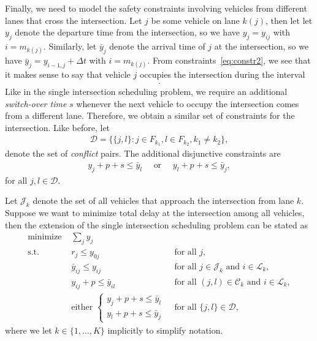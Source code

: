 \documentclass{article}
\theoremstyle{definition}
\theoremstyle{plain}
\begin{document}
Finally, we need to model the safety constraints involving vehicles from
different lanes that cross the intersection. Let $j$ be some vehicle on lane
$k(j)$, then let let $y_{j}$ denote the departure time from the intersection, so
we have $y_{j} = y_{ij}$ with $i=m_{k(j)}$. Similarly, let $\bar{y}_{j}$ denote
the arrival time of $j$ at the intersection, so we have
$\bar{y}_{j} = y_{i-1,j} + \Delta t$ with $i = m_{k(j)}$. From
constraints~\eqref{eq:constr2}, we see that it makes sense to say that vehicle
$j$ occupies the intersection during the interval
\begin{align}
  [\bar{y}_{j}, y_{j} + p] .
\end{align}
Like in the single intersection scheduling problem, we require an additional
\textit{switch-over time} $s$ whenever the next vehicle to occupy the
intersection comes from a different lane. Therefore, we obtain a similar set of
constraints for the intersection. Like before, let
\begin{align}
  \mathcal{D} = \{ \{j, l\} : j \in F_{k_{1}}, l \in F_{k_{2}} , k_{1} \neq k_{2} \} ,
\end{align}
denote the set of \textit{conflict} pairs. The additional disjunctive
constraints are
\begin{align}
  \label{eq:3}
  y_{j} + p + s \leq \bar{y}_{l} \quad \text{ or } \quad y_{l} + p + s \leq \bar{y}_{j} ,
\end{align}
for all $j, l \in \mathcal{D}$.

Let $\mathcal{J}_{k}$ denote the set of all vehicles that approach the
intersection from lane $k$. Suppose we want to minimize total delay at the
intersection among all vehicles, then the extension of the single intersection
scheduling problem can be stated as
\begin{subequations}
\begin{align}
  \label{eq:finite-buffer-problem}
  \text{minimize } & \sum_{j} y_{j} \\
  \text{s.t. } & r_{j} \leq y_{0j} & \text{ for all } j, \\
               & \bar{y}_{ij} \leq y_{ij} & \text{ for all } j \in \mathcal{J}_{k} \text{ and } i \in \mathcal{L}_{k}, \\
               & y_{ij} + p \leq \bar{y}_{il} & \text{ for all } (j,l) \in \mathcal{C}_{k} \text{ and } i \in \mathcal{L}_{k}, \\
               & \text{either } \begin{cases} y_{j} + p + s \leq \bar{y}_{l} \\ y_{l} + p + s \leq \bar{y}_{j} \end{cases} & \text{ for all } \{j,l\} \in \mathcal{D} ,
\end{align}
\end{subequations}
where we let $k \in \{1, \dots, K\}$ implicitly to simplify notation.
\end{document}
